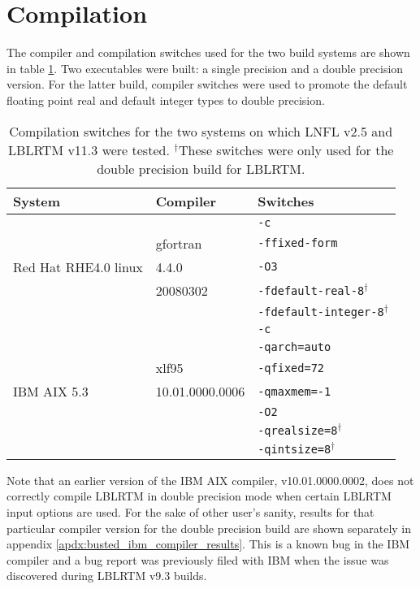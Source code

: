 \section{Compilation}
The compiler and compilation switches used for the two build systems are shown in table \ref{tab:lblrtm_compilation_switches}. Two executables were built: a single precision and a double precision version. For the latter build, compiler switches were used to promote the default floating point real and default integer types to double precision.

\begin{table}[htp]
  \centering
  \begin{tabular}{p{4cm} p{3cm} p{4cm}}
    \hline
    \sffamily\textbf{System} & \sffamily\textbf{Compiler} & \sffamily\textbf{Switches} \\
    \hline\hline
                         &          & \texttt{-c}\\
                         & gfortran & \texttt{-ffixed-form}\\
    Red Hat RHE4.0 linux & 4.4.0    & \texttt{-O3}\\
                         & 20080302 & \texttt{-fdefault-real-8}$^\dagger$\\
                         &          & \texttt{-fdefault-integer-8}$^\dagger$\\
    \hline
                         &                 & \texttt{-c}\\ 
                         &                 & \texttt{-qarch=auto}\\
                         & xlf95           & \texttt{-qfixed=72}\\
    IBM AIX 5.3          & 10.01.0000.0006 & \texttt{-qmaxmem=-1}\\
                         &                 & \texttt{-O2}\\
                         &                 & \texttt{-qrealsize=8}$^\dagger$\\
                         &                 & \texttt{-qintsize=8}$^\dagger$\\
    \hline
  \end{tabular}
  \caption{Compilation switches for the two systems on which LNFL v2.5 and LBLRTM v11.3 were tested. $^\dagger$These switches were only used for the double precision build for LBLRTM.}
  \label{tab:lblrtm_compilation_switches}
\end{table}

Note that an earlier version of the IBM AIX compiler, v10.01.0000.0002, does not correctly compile LBLRTM in double precision mode when certain LBLRTM input options are used. For the sake of other user's sanity, results for that particular compiler version for the double precision build are shown separately in appendix \ref{apdx:busted_ibm_compiler_results}. This is a known bug in the IBM compiler and a bug report was previously filed with IBM when the issue was discovered during LBLRTM v9.3 builds.
